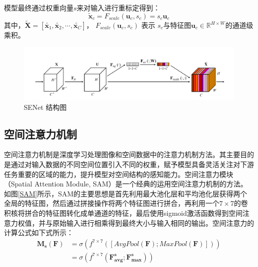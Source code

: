 模型最终通过权重向量$s$来对输入进行重标定得到：
\begin{equation}
    \widetilde{\mathbf{x}}_c=F_{scale}\left( \mathbf{u}_c,s_c \right) =s_c\mathbf{u}_c
\end{equation}
其中，$ \widetilde{\mathbf{X}}=\left[ \widetilde{\mathbf{x}_1},\widetilde{\mathbf{x}_2},\cdots ,\widetilde{\mathbf{x}_C} \right] $， $F_{scale}\left( \mathbf{u}_c,s_c \right)$ 表示 $s_c$与特征图$\mathbf{u}_c \in \mathbb{R}^{H\times W}$的通道级乘积。


\begin{figure}[h]
    \centering
    \includegraphics[width=14cm]{pic/chapter3/SENet.jpg}
    \caption{SENet 结构图}
    \label{SENet}
\end{figure}

\subsection{空间注意力机制}
空间注意力机制是深度学习处理图像和空间数据中的注意力机制方法。其主要目的是通过对输入数据的不同空间位置引入不同的权重，赋予模型具备灵活关注对下游任务重要的区域的能力，提升模型对空间结构的感知能力。空间注意力模块（Spatial Attention Module, SAM）是一个经典的运用空间注意力机制的方法。如图\ref{SAM}所示，SAM的主要思想是首先利用最大池化层和平均池化层获得两个全局的特征图，然后通过拼接操作将两个特征图进行拼合，再利用一个$7\times 7$的卷积核将拼合的特征图转化成单通道的特征，最后使用sigmoid激活函数得到空间注意力权值，并与原始输入进行相乘得到最终大小与输入相同的输出。空间注意力的计算公式如下式所示：
\begin{equation}
    \begin{aligned}
        \mathbf{M}_{\mathbf{s}}\left( \mathbf{F} \right) & =\sigma \left( f^{7\times 7}\left( \left[ AvgPool\left( \mathbf{F} \right) ;MaxPool\left( \mathbf{F} \right) \right] \right) \right)
        \\
                                                         & =\sigma \left( f^{7\times 7}\left( \mathbf{F}_{\mathbf{avg}}^{\mathbf{s}};\mathbf{F}_{\mathbf{max}}^{\mathbf{s}} \right) \right)
    \end{aligned}
\end{equation}

